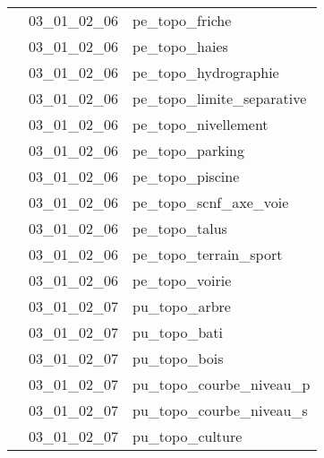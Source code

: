 \documentclass[12pt,titlepage,oneside]{book}
\begin{document}
\begin{supertabular}{|p{10cm}|c|p{15cm}|}
                    & 03\_01\_02\_06 & pe\_topo\_friche\\


                    & 03\_01\_02\_06 & pe\_topo\_haies\\


                    & 03\_01\_02\_06 & pe\_topo\_hydrographie\\


                    & 03\_01\_02\_06 & pe\_topo\_limite\_separative\\


                    & 03\_01\_02\_06 & pe\_topo\_nivellement\\


                    & 03\_01\_02\_06 & pe\_topo\_parking\\


                    & 03\_01\_02\_06 & pe\_topo\_piscine\\


                    & 03\_01\_02\_06 & pe\_topo\_scnf\_axe\_voie\\


                    & 03\_01\_02\_06 & pe\_topo\_talus\\


                    & 03\_01\_02\_06 & pe\_topo\_terrain\_sport\\


                    & 03\_01\_02\_06 & pe\_topo\_voirie\\


                    & 03\_01\_02\_07 & pu\_topo\_arbre\\


                    & 03\_01\_02\_07 & pu\_topo\_bati\\


                    & 03\_01\_02\_07 & pu\_topo\_bois\\


                    & 03\_01\_02\_07 & pu\_topo\_courbe\_niveau\_p\\


                    & 03\_01\_02\_07 & pu\_topo\_courbe\_niveau\_s\\


                    & 03\_01\_02\_07 & pu\_topo\_culture\\



\end{supertabular}
\end{document}
